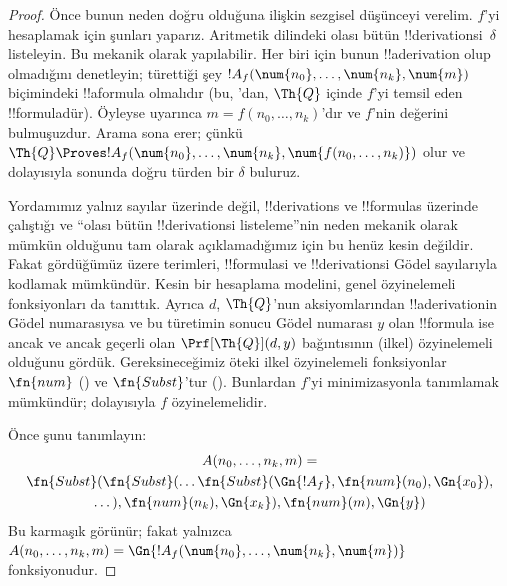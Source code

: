 \begin{proof}
Önce bunun neden doğru olduğuna ilişkin sezgisel düşünceyi verelim. $f$'yi
hesaplamak için şunları yaparız. Aritmetik dilindeki olası bütün
!!{derivation}s{}i~$\delta$ listeleyin. Bu mekanik olarak yapılabilir.
Her biri için bunun !!a{derivation} olup olmadığını denetleyin; türettiği
şey $!A_f(\num{n_0}, \dots, \num{n_k}, \num{m})$ biçimindeki
!!a{formula} olmalıdır (bu, 'dan, $\Th{Q}$ içinde $f$'yi
temsil eden !!{formula}{}dür). Öyleyse  uyarınca
$m=f(n_0,\dots,n_k)$'dır ve $f$'nin değerini bulmuşuzdur. Arama sona erer;
çünkü $\Th{Q} \Proves !A_f(\num{n_0}, \dots, \num{n_k},
\num{f(n_0, \dots, n_k)})$ olur ve dolayısıyla sonunda doğru türden bir
$\delta$ buluruz.

Yordamımız yalnız sayılar üzerinde değil, !!{derivation}s ve !!{formula}s
üzerinde çalıştığı ve ``olası bütün !!{derivation}s{}i listeleme''nin neden
mekanik olarak mümkün olduğunu tam olarak açıklamadığımız için bu henüz
kesin değildir. Fakat gördüğümüz üzere terimleri, !!{formula}s{}i ve
!!{derivation}s{}i Gödel sayılarıyla kodlamak mümkündür. Kesin bir hesaplama
modelini, genel özyinelemeli fonksiyonları da tanıttık. Ayrıca $d$,
$\Th{Q}$'nun aksiyomlarından !!a{derivation}{}in Gödel numarasıysa ve bu
türetimin sonucu Gödel numarası $y$ olan !!{formula} ise ancak ve ancak geçerli olan
$\Prf[\Th{Q}](d,y)$ bağıntısının (ilkel) özyinelemeli olduğunu gördük.
Gereksineceğimiz öteki ilkel özyinelemeli fonksiyonlar $\fn{num}$
() ve $\fn{Subst}$'tur
(). Bunlardan $f$'yi minimizasyonla
tanımlamak mümkündür; dolayısıyla $f$ özyinelemelidir.

Önce şunu tanımlayın:
\begin{multline*}
  A(n_0, \dots, n_k, m) = \\
  \fn{Subst}(\fn{Subst}(\dots\fn{Subst}(\Gn{!A_f}, \fn{num}(n_0), \Gn{x_0}),\\ \dots),
  \fn{num}(n_k),  \Gn{x_k}), \fn{num}(m), \Gn{y})
\end{multline*}
Bu karmaşık görünür; fakat yalnızca $A(n_0, \dots, n_k,
m) = \Gn{!A_f(\num{n_0}, \dots, \num{n_k}, \num{m})}$ fonksiyonudur.


\end{proof}
